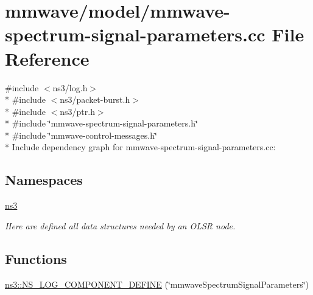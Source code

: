 \hypertarget{mmwave-spectrum-signal-parameters_8cc}{}\section{mmwave/model/mmwave-\/spectrum-\/signal-\/parameters.cc File Reference}
\label{mmwave-spectrum-signal-parameters_8cc}
{\ttfamily \#include $<$ns3/log.\+h$>$}\\*
{\ttfamily \#include $<$ns3/packet-\/burst.\+h$>$}\\*
{\ttfamily \#include $<$ns3/ptr.\+h$>$}\\*
{\ttfamily \#include \char`\"{}mmwave-\/spectrum-\/signal-\/parameters.\+h\char`\"{}}\\*
{\ttfamily \#include \char`\"{}mmwave-\/control-\/messages.\+h\char`\"{}}\\*
Include dependency graph for mmwave-\/spectrum-\/signal-\/parameters.cc\+:
\subsection*{Namespaces}
\begin{DoxyCompactItemize}
\item 
 \hyperlink{namespacens3}{ns3}
\begin{DoxyCompactList}\small\item\em Here are defined all data structures needed by an O\+L\+SR node. \end{DoxyCompactList}\end{DoxyCompactItemize}
\subsection*{Functions}
\begin{DoxyCompactItemize}
\item 
\hyperlink{namespacens3_a161f5ff6fd4ededd1589b407ff34fd08}{ns3\+::\+N\+S\+\_\+\+L\+O\+G\+\_\+\+C\+O\+M\+P\+O\+N\+E\+N\+T\+\_\+\+D\+E\+F\+I\+NE} (\char`\"{}mmwave\+Spectrum\+Signal\+Parameters\char`\"{})
\end{DoxyCompactItemize}
